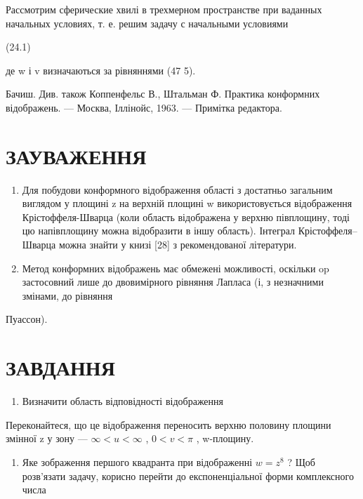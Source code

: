 \documentclass[
  ukrainian,
]{article}
\providecommand{\tightlist}{%
  \setlength{\itemsep}{0pt}\setlength{\parskip}{0pt}}
\begin{document}
Рассмотрим сферические хвилі в трехмерном пространстве при ваданных
начальных условиях, т. е. решим задачу с начальными условиями

(24.1)

де w і v визначаються за рівняннями (47 5).

Бачиш. Див. також Коппенфельс В., Штальман Ф. Практика конформних
відображень. --- Москва, Іллінойс, 1963. --- Примітка редактора.

\section{ЗАУВАЖЕННЯ}\label{ux437ux430ux443ux432ux430ux436ux435ux43dux43dux44f-9}

\begin{enumerate}
\def\labelenumi{\arabic{enumi}.}
\item
  Для побудови конформного відображення області з достатньо загальним
  виглядом у площині z на верхній площині w використовується
  відображення Крістоффеля-Шварца (коли область відображена у верхню
  півплощину, тоді цю напівплощину можна відобразити в іншу область).
  Інтеграл Крістоффеля--Шварца можна знайти у книзі {[}28{]} з
  рекомендованої літератури.
\item
  Метод конформних відображень має обмежені можливості, оскільки op
  застосовний лише до двовимірного рівняння Лапласа (і, з незначними
  змінами, до рівняння
\end{enumerate}

Пуассон).

\section{ЗАВДАННЯ}\label{ux437ux430ux432ux434ux430ux43dux43dux44f-12}

\begin{enumerate}
\def\labelenumi{\arabic{enumi}.}
\tightlist
\item
  Визначити область відповідності відображення
\end{enumerate}

Переконайтеся, що це відображення переносить верхню половину площини
змінної z у зону --- \(\infty < u < \infty\) , \(0 < v < \pi\) ,
w-площину.

\begin{enumerate}
\def\labelenumi{\arabic{enumi}.}
\setcounter{enumi}{1}
\tightlist
\item
  Яке зображення першого квадранта при відображенні \(w=z^{8}\) ? Щоб
  розв'язати задачу, корисно перейти до експоненціальної форми
  комплексного числа
\end{enumerate}
\end{document}
